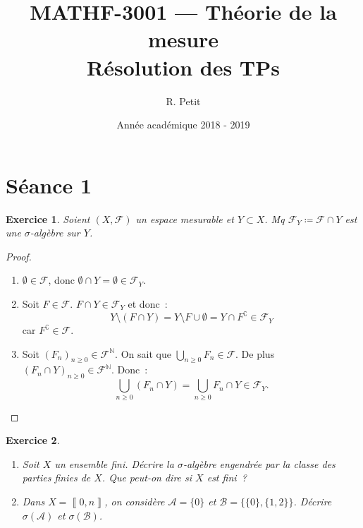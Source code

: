 \documentclass{article}
\title{MATHF-3001 --- Théorie de la mesure \\Résolution des TPs}
\author{R. Petit}
\date{Année académique 2018 - 2019}
\newtheorem{ex}{Exercice}[section]
\theoremstyle{definition}
\newcommand{\C}{\complement}
\newcommand{\N}{{\mathbb N}}
\newcommand{\intint}[2]{\left\llbracket#1, #2\right\rrbracket}
\begin{document}
\maketitle

\section{Séance 1}

\begin{ex} Soient $(X, \mathcal F)$ un espace mesurable et $Y \subset X$. Mq $\mathcal F_Y \coloneqq \mathcal F \cap Y$ est une $\sigma$-algèbre sur $Y$.
\end{ex}

\begin{proof}~
\begin{enumerate}
	\item $\emptyset \in \mathcal F$, donc $\emptyset \cap Y = \emptyset \in \mathcal F_Y$.
	\item Soit $F \in \mathcal F$. $F \cap Y \in \mathcal F_Y$ et donc~:
	\[Y \setminus (F \cap Y) = Y \setminus F \cup \emptyset = Y \cap F^\C \in \mathcal F_Y\]
	car $F^\C \in \mathcal F$.
	\item Soit $(F_n)_{n \geq 0} \in \mathcal F^\N$. On sait que $\bigcup_{n \geq 0}F_n \in \mathcal F$. De plus $(F_n \cap Y)_{n \geq 0} \in \mathcal F^\N$. Donc~:
	\[\bigcup_{n \geq 0}(F_n \cap Y) = \bigcup_{n \geq 0}F_n \cap Y \in \mathcal F_Y.\]
\end{enumerate}
\end{proof}

\begin{ex}~
\begin{enumerate}
	\item Soit $X$ un ensemble fini. Décrire la $\sigma$-algèbre engendrée par la classe des parties finies de $X$. Que peut-on dire si $X$ est fini~?
	\item Dans $X = \intint 0n$, on considère $\mathcal A = \{0\}$ et $\mathcal B = \{\{0\}, \{1, 2\}\}$. Décrire $\sigma(\mathcal A)$ et $\sigma(\mathcal B)$.
\end{enumerate}
\end{ex}
\end{document}
